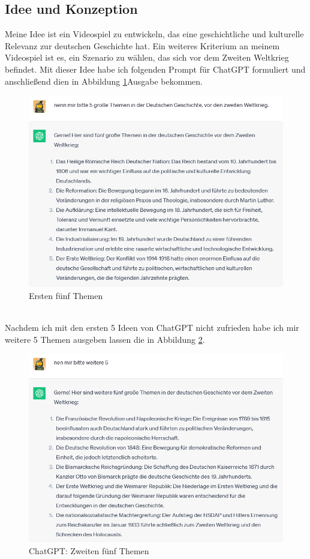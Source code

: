 \documentclass[10pt,a4paper,bibliography=totocnumbered,listof=totocnumbered]{scrartcl}
\begin{document}
\subsection {Idee und Konzeption}
Meine Idee ist ein Videospiel zu entwickeln, das eine geschichtliche und kulturelle Relevanz zur deutschen Geschichte hat. Ein weiteres Kriterium an meinem Videospiel ist es, ein Szenario zu wählen, das sich vor dem Zweiten Weltkrieg befindet. Mit dieser Idee habe ich folgenden Prompt für ChatGPT formuliert und anschließend dien in Abbildung \ref{ersten-5-themen}Ausgabe bekommen.
\begin{figure}[h]
   		 \centering
\includegraphics[width=14cm]{BilderFuerBA/CGPTBachelorarbeitZurKI/01.png}
   		 \caption{Ersten fünf Themen}
   		 \label{ersten-5-themen}
\end{figure}
\\
Nachdem ich mit den ersten 5 Ideen von ChatGPT nicht zufrieden habe ich mir weitere 5 Themen ausgeben lassen die in Abbildung \ref{zweiten-5-themen}.
\begin{figure}[h]
   		 \centering
\includegraphics[width=14cm]{BilderFuerBA/CGPTBachelorarbeitZurKI/02.png}
   		 \caption{ChatGPT: Zweiten fünf Themen}
   		 \label{zweiten-5-themen}
\end{figure}
\end{document}
